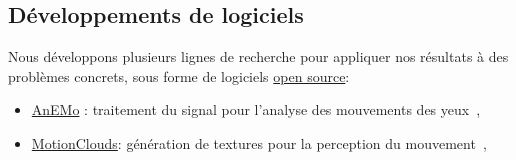 \documentclass[10pt,french,a4paper,twoside]{article}%
\begin{document}
\begin{itemize}
\end{itemize}


\subsection{Développements de logiciels} %

Nous développons plusieurs lignes de recherche pour appliquer nos résultats à des problèmes concrets, sous forme de logiciels \href{https://laurentperrinet.github.io/project/open-science/}{open source}:

\begin{itemize}

	\item \href{https://github.com/invibe/AnEMo}{AnEMo} : traitement du signal pour l'analyse des mouvements des yeux~\citep{Pasturel18anemo},
	\item \href{http://github.com/NeuralEnsemble/MotionClouds}{MotionClouds}: génération de textures pour la perception du mouvement~\citep{Sanz12,Vacher15nips,Vacher16},
\end{itemize}
\end{document}
